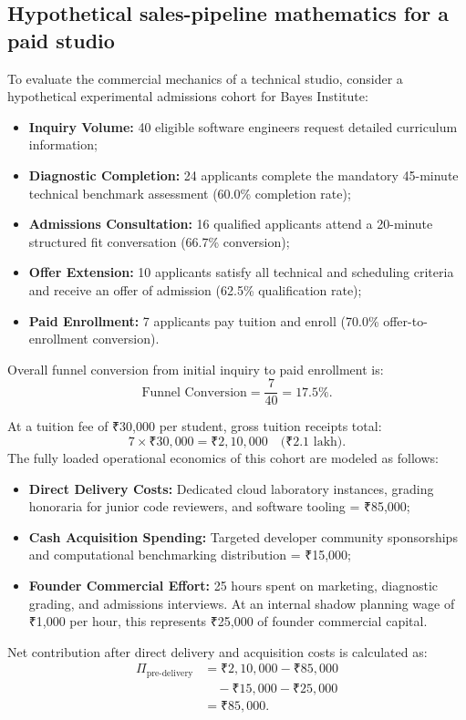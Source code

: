 \subsection{Hypothetical sales-pipeline mathematics for a paid studio}

To evaluate the commercial mechanics of a technical studio, consider a hypothetical experimental admissions cohort for Bayes Institute:
\begin{itemize}
\item \textbf{Inquiry Volume:} 40 eligible software engineers request detailed curriculum information;
\item \textbf{Diagnostic Completion:} 24 applicants complete the mandatory 45-minute technical benchmark assessment (60.0\% completion rate);
\item \textbf{Admissions Consultation:} 16 qualified applicants attend a 20-minute structured fit conversation (66.7\% conversion);
\item \textbf{Offer Extension:} 10 applicants satisfy all technical and scheduling criteria and receive an offer of admission (62.5\% qualification rate);
\item \textbf{Paid Enrollment:} 7 applicants pay tuition and enroll (70.0\% offer-to-enrollment conversion).
\end{itemize}
Overall funnel conversion from initial inquiry to paid enrollment is:
\begin{equation}
\text{Funnel Conversion} = \frac{7}{40} = 17.5\%.
\end{equation}

At a tuition fee of ₹30,000 per student, gross tuition receipts total:
\begin{equation}
7 \times ₹30,000 = ₹2,10,000 \quad \text{(₹2.1 lakh)}.
\end{equation}
The fully loaded operational economics of this cohort are modeled as follows:
\begin{itemize}
\item \textbf{Direct Delivery Costs:} Dedicated cloud laboratory instances, grading honoraria for junior code reviewers, and software tooling = ₹85,000;
\item \textbf{Cash Acquisition Spending:} Targeted developer community sponsorships and computational benchmarking distribution = ₹15,000;
\item \textbf{Founder Commercial Effort:} 25 hours spent on marketing, diagnostic grading, and admissions interviews. At an internal shadow planning wage of ₹1,000 per hour, this represents ₹25,000 of founder commercial capital.
\end{itemize}
Net contribution after direct delivery and acquisition costs is calculated as:
\begin{equation}
\begin{aligned}
\Pi_{\text{pre-delivery}} &= ₹2,10,000 - ₹85,000 \\
&\quad - ₹15,000 - ₹25,000 \\
&= ₹85,000.
\end{aligned}
\end{equation}


